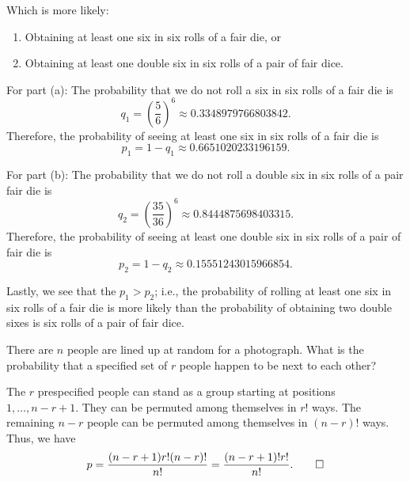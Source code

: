 \begin{problem}[Handout 1, \# 12]
  Which is more likely:
  \begin{enumerate}[label=(\alph*),noitemsep]
  \item Obtaining at least one six in six rolls of a fair die, or
  \item Obtaining at least one double six in six rolls of a pair of fair
    dice.
  \end{enumerate}
\end{problem}
\begin{solution*}
  For part (a): The probability that we do not roll a six in six rolls of a
  fair die is
  \[
    q_1=\left(\frac{5}{6}\right)^6\approx\num{0.3348979766803842}.
  \]
  Therefore, the probability of seeing at least one six in six rolls of a
  fair die is
  \[
    p_1=1-q_1\approx\num{0.6651020233196159}.
  \]

  For part (b): The probability that we do not roll a double six in six
  rolls of a pair fair die is
  \[
    q_2=\left(\frac{35}{36}\right)^6\approx\num{0.8444875698403315}.
  \]
  Therefore, the probability of seeing at least one double six in six rolls
  of a pair of fair die is
  \[
    p_2=1-q_2\approx\num{0.15551243015966854}.
  \]

  Lastly, we see that the \(p_1>p_2\); i.e., the probability of rolling at
  least one six in six rolls of a fair die is more likely than the
  probability of obtaining two double sixes is six rolls of a pair of fair
  dice.
\end{solution*}

\begin{problem}[Handout 1, \# 13]
  There are \(n\) people are lined up at random for a photograph. What is
  the probability that a specified set of \(r\) people happen to be next to
  each other?
\end{problem}
\begin{solution*}
  The \(r\) prespecified people can stand as a group starting at positions
  \(1,\dotsc,n-r+1\). They can be permuted among themselves in \(r!\)
  ways. The remaining \(n-r\) people can be permuted among themselves in
  \((n-r)!\) ways. Thus, we have
  \[
    p=\frac{(n-r+1)r!(n-r)!}{n!}=\frac{(n-r+1)!r!}{n!}.\qedhere
  \]
\end{solution*}

